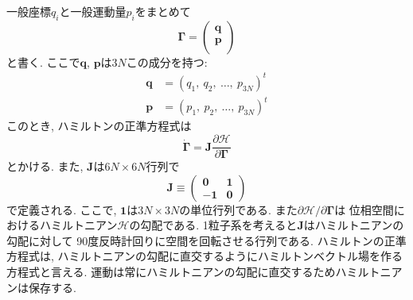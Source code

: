 一般座標$q_{i}$と一般運動量$p_{i}$をまとめて
\begin{equation}
 \bm{\Gamma}
=\begin{pmatrix}
  \bm{q} \\
  \bm{p} \\
 \end{pmatrix}
\end{equation}
と書く. 
ここで$\bm{q}$, $\bm{p}$は$3N$この成分を持つ:
\begin{align}
  \bm{q} &= (q_{1},~ q_{2},~ \ldots,~ p_{3N})^{t}
  \\
  \bm{p} &= (p_{1},~ p_{2},~ \ldots,~ p_{3N})^{t}
\end{align}
このとき, ハミルトンの正準方程式は
\begin{equation}
 \dot{\bm{\Gamma}}
=\bm{J}\frac{\partial \mathcal{H}}{\partial \bm{\Gamma}}
\end{equation}
とかける. 
また, $\bm{J}$は$6N \times 6N$行列で
\begin{equation}
 \bm{J}
 \equiv
 \begin{pmatrix}
  \bm{0}  & \bm{1} \\
  \bm{-1} & \bm{0}
 \end{pmatrix}
\end{equation}
で定義される.
ここで, $\bm{1}$は$3N \times 3N$の単位行列である. 
また$\partial \mathcal{H}/\partial \bm{\Gamma}$は
位相空間におけるハミルトニアン$\mathcal{H}$の勾配である. 
1粒子系を考えると$\bm{J}$はハミルトニアンの勾配に対して
90度反時計回りに空間を回転させる行列である. 
ハミルトンの正準方程式は, ハミルトニアンの勾配に直交するようにハミルトンベクトル場を作る方程式と言える. 
運動は常にハミルトニアンの勾配に直交するためハミルトニアンは保存する. 

